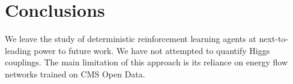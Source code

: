 \section{Conclusions}\label{sec:conclusions}

We leave the study of deterministic reinforcement learning agents at
next-to-leading power to future work. We have not attempted to quantify
Higgs couplings. The main limitation of this approach is its reliance on
energy flow networks trained on CMS Open Data.


